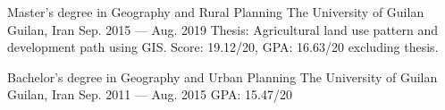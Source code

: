 
\begin{cventries}

\cventry
{Master's degree in Geography and Rural Planning}
{The University of Guilan}
{Guilan, Iran}
{Sep. 2015 --- Aug. 2019}
{Thesis: Agricultural land use pattern and development path using GIS. Score: 19.12/20, GPA: 16.63/20 excluding thesis.}

\vspace{0.4em}

\cventry
{Bachelor's degree in Geography and Urban Planning}
{The University of Guilan}
{Guilan, Iran}
{Sep. 2011 --- Aug. 2015}
{GPA: 15.47/20}

\end{cventries}